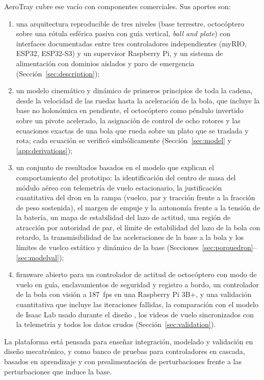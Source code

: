 AeroTray cubre ese vacío con componentes comerciales. Sus aportes son:
\begin{enumerate}[label=(\roman*)]
  \item una arquitectura reproducible de tres niveles (base terrestre, octocóptero sobre una rótula esférica pasiva con guía vertical, \textit{ball and plate}) con interfaces documentadas entre tres controladores independientes (myRIO, ESP32, ESP32-S3) y un supervisor Raspberry Pi, y un sistema de alimentación con dominios aislados y paro de emergencia (Sección~\ref{sec:description});
  \item un modelo cinemático y dinámico de primeros principios de toda la cadena, desde la velocidad de las ruedas hasta la aceleración de la bola, que incluye la base no holonómica en pendiente, el octocóptero como péndulo invertido sobre un pivote acelerado, la asignación de control de ocho rotores y las ecuaciones exactas de una bola que rueda sobre un plato que se traslada y rota; cada ecuación se verificó simbólicamente (Sección~\ref{sec:model} y \ref{app:derivations});
  \item un conjunto de resultados basados en el modelo que explican el comportamiento del prototipo: la identificación del centro de masa del módulo aéreo con telemetría de vuelo estacionario, la justificación cuantitativa del dron en la rampa (vuelco, par y tracción frente a la fracción de peso sostenida), el margen de empuje y la autonomía frente a la tensión de la batería, un mapa de estabilidad del lazo de actitud, una región de atracción por autoridad de par, el límite de estabilidad del lazo de la bola con retardo, la transmisibilidad de las aceleraciones de la base a la bola y los límites de vuelco estático y dinámico de la base (Secciones~\ref{sec:porquedron}--\ref{sec:modelval});
  \item firmware abierto para un controlador de actitud de octocóptero con modo de vuelo en guía, enclavamientos de seguridad y registro a bordo, un controlador de la bola con visión a \SI{187}{fps} en una Raspberry Pi 3B+, y una validación cuantitativa que incluye las iteraciones fallidas, la comparación con el modelo de Isaac Lab usado durante el diseño \cite{mittal2023,schulman2017}, los videos de vuelo sincronizados con la telemetría y todos los datos crudos (Sección~\ref{sec:validation}).
\end{enumerate}
La plataforma está pensada para enseñar integración, modelado y validación en diseño mecatrónico, y como banco de pruebas para controladores en cascada, basados en aprendizaje y con prealimentación de perturbaciones frente a las perturbaciones que induce la base.
